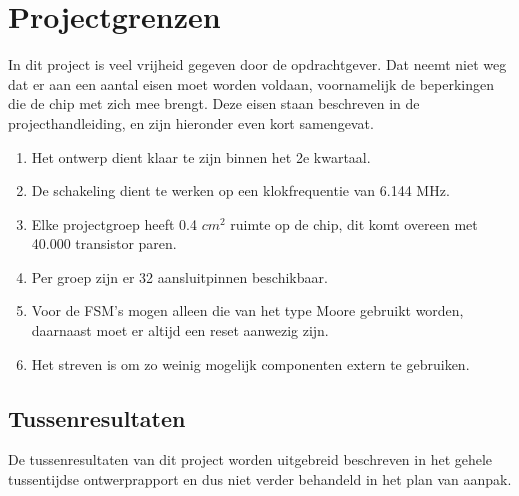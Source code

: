 \documentclass[oneside,dutch]{tudelft-report}
\begin{document}
\section{Projectgrenzen}
In dit project is veel vrijheid gegeven door de opdrachtgever. Dat neemt niet weg dat er aan een aantal eisen moet worden voldaan, voornamelijk de beperkingen die de chip met zich mee brengt. Deze eisen staan beschreven in de projecthandleiding, en zijn hieronder even kort samengevat.
\begin{enumerate}
\item Het ontwerp dient klaar te zijn binnen het 2e kwartaal.
\item De schakeling dient te werken op een klokfrequentie van 6.144 MHz.
\item Elke projectgroep heeft 0.4 $cm^2$ ruimte op de chip, dit komt overeen met 40.000 transistor paren.
\item Per groep zijn er 32 aansluitpinnen beschikbaar.
\item Voor de FSM's mogen alleen die van het type Moore gebruikt worden, daarnaast moet er altijd een reset aanwezig zijn.
\item Het streven is om zo weinig mogelijk componenten extern te gebruiken.
\end{enumerate}

\subsection{Tussenresultaten}
De tussenresultaten van dit project worden uitgebreid beschreven in het gehele tussentijdse ontwerprapport en dus niet verder behandeld in het plan van aanpak.
\end{document}
